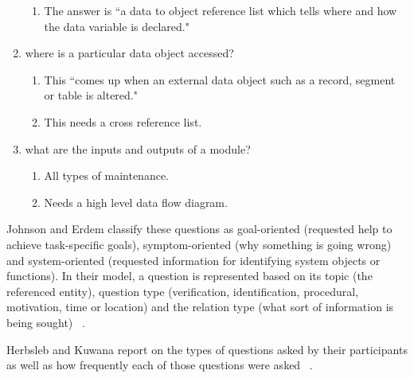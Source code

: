 \begin{enumerate}
\begin{enumerate}
	\item The answer is ``a data to object reference list which tells where and how the data variable is declared."
    \end{enumerate}
\item where is a particular data object accessed?
	\begin{enumerate}
	\item This ``comes up when an external data object such as a record, segment or table is altered."
	\item This needs a cross reference list.
    \end{enumerate}
\item what are the inputs and outputs of a module? 
	\begin{enumerate}
	\item All types of maintenance.
	\item Needs a high level data flow diagram.
    \end{enumerate}
\end{enumerate}

Johnson and Erdem classify these questions as goal-oriented (requested help to achieve task-specific goals), symptom-oriented (why something is going wrong) and system-oriented (requested information for identifying system objects or functions). In their model, a question is represented based on its topic (the referenced entity), question type (verification, identification, procedural, motivation, time or location) and the relation type (what sort of information is being sought) ~\cite{Johnson:1995}.

Herbsleb and Kuwana report on the types of questions asked by their participants as well as how frequently each of those questions were asked ~\cite{Herbsleb:1993}.

